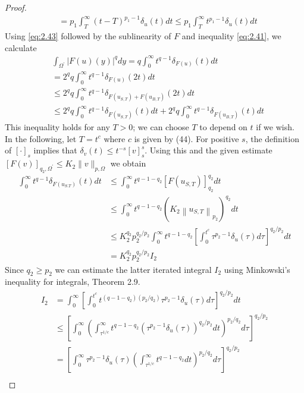 \begin{proof}
\[\begin{aligned}
  & =p_1 \int_T^{\infty}(t-T)^{p_1-1} \delta_u(t) d t \leq p_1 \int_T^{\infty} t^{p_1-1} \delta_u(t) d t
  \end{aligned}
  \]
  Using \eqref{eq:2.43} followed by the sublinearity of $F$ and inequality \eqref{eq:2.41},
  we calculate
  \[
  \begin{aligned}
  & \int_{\Omega^{\prime}}|F(u)(y)|^q d y=q \int_0^{\infty} t^{q-1} \delta_{F(u)}(t) d t \\
  &=2^q q \int_0^{\infty} t^{q-1} \delta_{F(u)}(2 t) d t \\
  & \leq 2^q q \int_0^{\infty} t^{q-1} \delta_{F\left(u_{S, T}\right)+F\left(u_{B, T}\right)}(2 t) d t \\
  & \leq 2^q q \int_0^{\infty} t^{q-1} \delta_{F\left(u_{S, T}\right)}(t) d t+2^q q \int_0^{\infty} t^{q-1} \delta_{F\left(u_{B, T}\right)}(t) d t
  \end{aligned}
  \]
  This inequality holds for any $T>0$; we can choose $T$ to depend on $t$ if we wish.
  In the following, let $T=t^c$ where $c$ is given by (44). For positive $s$,
  the definition of $[\cdot]_s$ implies that $\delta_v(t) \leq t^{-s}[v]_s^s$.
  Using this and the given estimate $[F(v)]_{q_2, \Omega^{\prime}} \leq K_2\|v\|_{p, \Omega}$ we obtain
  \[
  \begin{aligned}
  \int_0^{\infty} t^{q-1} \delta_{F\left(u_{S . T}\right)}(t) d t & \leq \int_0^{\infty} t^{q-1-q_2}\left[F\left(u_{S, T}\right)\right]_{q_2}^{q_2} d t \\
  & \leq \int_0^{\infty} t^{q-1-q_2}\left(K_2\left\|u_{S, T}\right\|_{p_2}\right)^{q_2} d t \\
  & \leq K_2^{q_2} p_2^{q_2 / p_2} \int_0^{\infty} t^{q-1-q_2}\left[\int_0^{t^c} \tau^{p_2-1} \delta_u(\tau) d \tau\right]^{q_2 / p_2} d t \\
  & =K_2^{q_2} p_2^{q_2 / p_2} I_2
  \end{aligned}
  \]
  Since $q_2 \geq p_2$ we can estimate the latter iterated integral $I_2$ using Minkowski's
  inequality for integrals, Theorem 2.9.
  \[
  \begin{aligned}
  I_2 & =\int_0^{\infty}\left[\int_0^{t^c} t^{\left(q-1-q_2\right)\left(p_2 / q_2\right)} \tau^{p_2-1} \delta_u(\tau) d \tau\right]^{q_2 / p_2} d t \\
  & \leq\left[\int_0^{\infty}\left(\int_{\tau^{1 / c}}^{\infty} t^{q-1-q_2}\left(\tau^{p_2-1} \delta_u(\tau)\right)^{q_2 / p_2} d t\right)^{p_2 / q_2} d \tau\right]^{q_2 / p_2} \\
  & =\left[\int_0^{\infty} \tau^{p_2-1} \delta_u(\tau)\left(\int_{\tau^{1 / c}}^{\infty} t^{q-1-q_2} d t\right)^{p_2 / q_2} d \tau\right]^{q_2 / p_2} \\

\end{aligned}\]
\end{proof}
